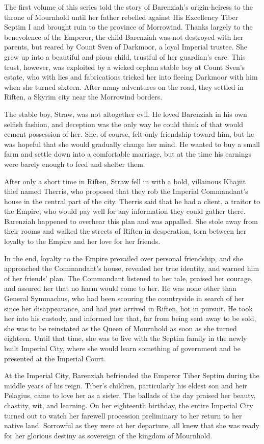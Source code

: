 \clearpage
{}

\dropcap The first volume of this series told the story of Barenziah's origin-heiress to the throne of Mournhold until her father rebelled against His Excellency Tiber Septim I and brought ruin to the province of Morrowind. Thanks largely to the benevolence of the Emperor, the child Barenziah was not destroyed with her parents, but reared by Count Sven of Darkmoor, a loyal Imperial trustee. She grew up into a beautiful and pious child, trustful of her guardian's care. This trust, however, was exploited by a wicked orphan stable boy at Count Sven's estate, who with lies and fabrications tricked her into fleeing Darkmoor with him when she turned sixteen. After many adventures on the road, they settled in Riften, a Skyrim city near the Morrowind borders.

The stable boy, Straw, was not altogether evil. He loved Barenziah in his own selfish fashion, and deception was the only way he could think of that would cement possession of her. She, of course, felt only friendship toward him, but he was hopeful that she would gradually change her mind. He wanted to buy a small farm and settle down into a comfortable marriage, but at the time his earnings were barely enough to feed and shelter them.

After only a short time in Riften, Straw fell in with a bold, villainous Khajiit thief named Therris, who proposed that they rob the Imperial Commandant's house in the central part of the city. Therris said that he had a client, a traitor to the Empire, who would pay well for any information they could gather there. Barenziah happened to overhear this plan and was appalled. She stole away from their rooms and walked the streets of Riften in desperation, torn between her loyalty to the Empire and her love for her friends.

In the end, loyalty to the Empire prevailed over personal friendship, and she approached the Commandant's house, revealed her true identity, and warned him of her friends' plan. The Commandant listened to her tale, praised her courage, and assured her that no harm would come to her. He was none other than General Symmachus, who had been scouring the countryside in search of her since her disappearance, and had just arrived in Riften, hot in pursuit. He took her into his custody, and informed her that, far from being sent away to be sold, she was to be reinstated as the Queen of Mournhold as soon as she turned eighteen. Until that time, she was to live with the Septim family in the newly built Imperial City, where she would learn something of government and be presented at the Imperial Court.

At the Imperial City, Barenziah befriended the Emperor Tiber Septim during the middle years of his reign. Tiber's children, particularly his eldest son and heir Pelagius, came to love her as a sister. The ballads of the day praised her beauty, chastity, wit, and learning. On her eighteenth birthday, the entire Imperial City turned out to watch her farewell procession preliminary to her return to her native land. Sorrowful as they were at her departure, all knew that she was ready for her glorious destiny as sovereign of the kingdom of Mournhold.